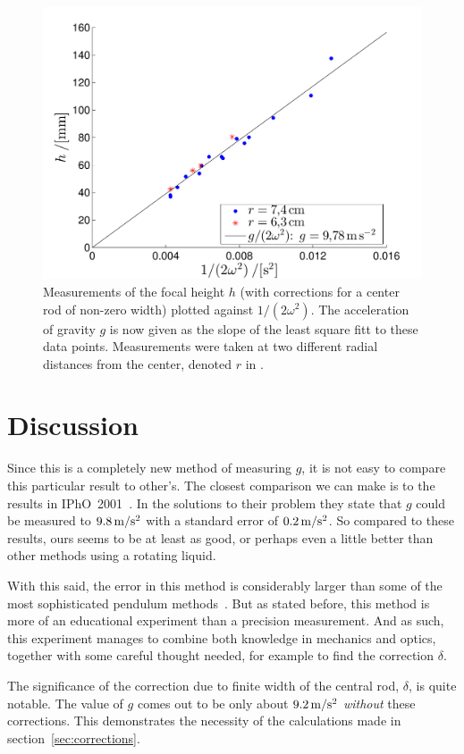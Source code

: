 \documentclass[11pt,
a4paper, 
swedish, english]{article}
\begin{document}
\begin{figure}\centering 
\includegraphics[width=.8\linewidth]{g_minsta_kvadrat.pdf}
\caption{\label{fig:data} Measurements of the focal height $h$ (with
  corrections for a center rod of non-zero width) plotted against
  $1/(2\omega^2)$. The acceleration of gravity $g$ is now given as the
  slope of the least square fitt to these data points. Measurements
  were taken at two different radial distances from the center,
  denoted $r$ in .
}
\end{figure}



\section{Discussion}
Since this is a completely new method of measuring $g$, it is not
easy to compare this particular result to other's. The closest
comparison we can make is to the results in
IPhO~2001~\cite{IPhO2001}. In the solutions to their problem
they state that $g$ could be measured to
$\unit[9.8]{m/s^2}$ with a standard error of $\unit[0.2]{m/s^2}$. So
compared to these results, ours seems to be at least as good, or perhaps
even a little better than other methods using a rotating liquid. 

With this said, the error in this method is considerably larger than
some of the most sophisticated pendulum methods~\cite{Candela2001}. But
as stated before, this method is more of an educational experiment
than a precision measurement. And as such, this experiment manages to
combine both knowledge in mechanics and optics, together with some
careful thought needed, for example to find the correction $\delta$. 

The significance of the correction due to finite width of the central
rod, $\delta$, is quite notable. The value of $g$ comes out to be only
about $\unit[9.2]{m/s^2}$ \emph{without} these corrections. This
demonstrates the necessity of the calculations made in
section~\ref{sec:corrections}. 
\end{document}

